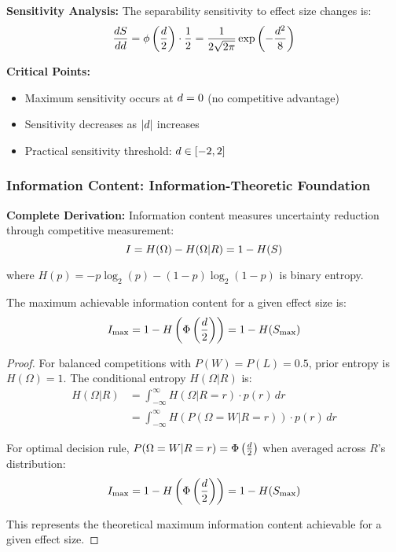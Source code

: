 \textbf{Sensitivity Analysis:}
The separability sensitivity to effect size changes is:
\begin{equation}
\frac{dS}{dd} = \phi\left(\frac{d}{2}\right) \cdot \frac{1}{2} = \frac{1}{2\sqrt{2\pi}} \exp\left(-\frac{d^2}{8}\right)
\end{equation}

\textbf{Critical Points:}
\begin{itemize}
\item Maximum sensitivity occurs at $d = 0$ (no competitive advantage)
\item Sensitivity decreases as $|d|$ increases
\item Practical sensitivity threshold: $d \in [-2, 2]$
\end{itemize}

\subsubsection{Information Content: Information-Theoretic Foundation}

\textbf{Complete Derivation:}
Information content measures uncertainty reduction through competitive measurement:
\begin{equation}
I = H(\Omega) - H(\Omega|R) = 1 - H(S)
\end{equation}

where $H(p) = -p \log_2(p) - (1-p) \log_2(1-p)$ is binary entropy.

\begin{theorem}
\label{thm:information_bounds}
The maximum achievable information content for a given effect size is:
\begin{equation}
I_{\max} = 1 - H\left(\Phi\left(\frac{d}{2}\right)\right) = 1 - H(S_{\max})
\end{equation}
\end{theorem}

\begin{proof}
For balanced competitions with $P(W) = P(L) = 0.5$, prior entropy is $H(\Omega) = 1$. The conditional entropy $H(\Omega|R)$ is:
\begin{align}
H(\Omega|R) &= \int_{-\infty}^{\infty} H(\Omega|R=r) \cdot p(r) \, dr \\
&= \int_{-\infty}^{\infty} H(P(\Omega=W|R=r)) \cdot p(r) \, dr
\end{align}

For optimal decision rule, $P(\Omega=W|R=r) = \Phi\left(\frac{d}{2}\right)$ when averaged across $R$'s distribution:
\begin{equation}
I_{\max} = 1 - H\left(\Phi\left(\frac{d}{2}\right)\right) = 1 - H(S_{\max})
\end{equation}

This represents the theoretical maximum information content achievable for a given effect size.
\end{proof}

